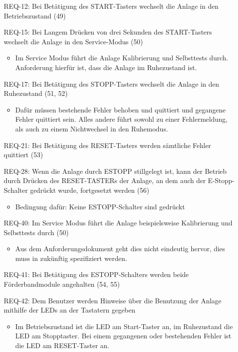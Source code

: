 \begin{itemize}
    \item[REQ-12:] Bei Betätigung des START-Tasters wechselt die Anlage in den Betriebszustand (49)
    \item[REQ-15:] Bei Langem Drücken von drei Sekunden des START-Tasters wechselt die Anlage in den Service-Modus (50)
    \begin{itemize}
        \item Im Service Modus führt die Anlage Kalibrierung und Selbsttests durch. Anforderung hierfür ist, dass die Anlage im Ruhezustand ist.
    \end{itemize}
    \item[REQ-17:] Bei Betätigung des STOPP-Tasters wechselt die Anlage in den Ruhezustand (51, 52)
    \begin{itemize}
        \item Dafür müssen bestehende Fehler behoben und quittiert und gegangene Fehler quittiert sein. Alles andere führt sowohl zu einer Fehlermeldung, als auch zu einem Nichtwechsel in den Ruhemodus.
    \end{itemize}
    \item[REQ-21:] Bei Betätigung des RESET-Tasters werden sämtliche Fehler quittiert (53)
    \item[REQ-28:] Wenn die Anlage durch ESTOPP stillgelegt ist, kann der Betrieb durch Drücken des RESET-TASTERs der Anlage, an dem auch der E-Stopp-Schalter gedrückt wurde, fortgesetzt werden (56)
    \begin{itemize}
        \item Bedingung dafür: Keine ESTOPP-Schalter sind gedrückt
    \end{itemize}
    \item[REQ-40:] Im Service Modus führt die Anlage beispielsweise Kalibrierung und Selbsttests durch (50)
    \begin{itemize}
        \item Aus dem Anforderungsdokument geht dies nicht eindeutig hervor, dies muss in zukünftig spezifiziert werden.
    \end{itemize}
    \item[REQ-41:] Bei Betätigung des ESTOPP-Schalters werden beide Förderbandmodule angehalten (54, 55)
    \item[REQ-42:] Dem Benutzer werden Hinweise über die Benutzung der Anlage mithilfe der LEDs an der Tastatern gegeben
    \begin{itemize}
        \item Im Betriebszustand ist die LED am Start-Taster an, im Ruhezustand die LED am Stopptaster. Bei einem gegangenen oder bestehenden Fehler ist die LED am RESET-Taster an.
    \end{itemize}
\end{itemize}

